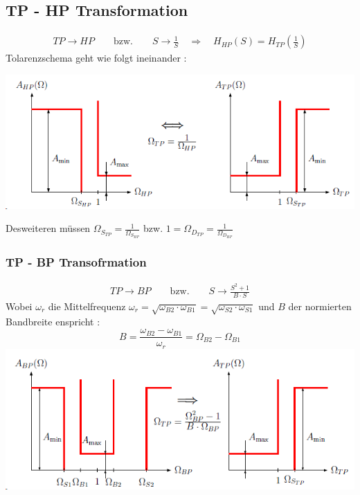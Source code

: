 \subsection{TP - HP Transformation}
\begin{align*}
	TP \rightarrow HP \qquad \text{bzw.} \qquad S \rightarrow \frac{1}{S} \quad\Rightarrow\quad H_{HP}(S) = H_{TP}\left(\frac{1}{S}\right)
\end{align*}
Tolarenzschema geht wie folgt ineinander :
\begin{center}
	\includegraphics[width=\columnwidth]{Images/hptp}
\end{center}
Desweiteren müssen $\Omega_{S_{TP}} = \frac{1}{\Omega_{S_{HP}}}$ bzw. $1 = \Omega_{D_{TP}} = \frac{1}{\Omega_{D_{HP}}}$

\subsubsection{TP - BP Transofrmation}
\begin{align*}
	TP \rightarrow BP \qquad \text{bzw.} \qquad S \rightarrow \frac{S^2 + 1}{B\cdot S}
\end{align*}
Wobei $\omega_r$ die Mittelfrequenz $\omega_r = \sqrt{\omega_{B2}\cdot \omega_{B1}} =  \sqrt{\omega_{S2}\cdot \omega_{S1}}$ und $B$ der normierten Bandbreite enspricht :
\[
B= \frac{\omega_{B2} - \omega_{B1}}{\omega_r} = \Omega_{B2} - \Omega_{B1}
\]
\includegraphics[width=\columnwidth]{Images/tpbp}

